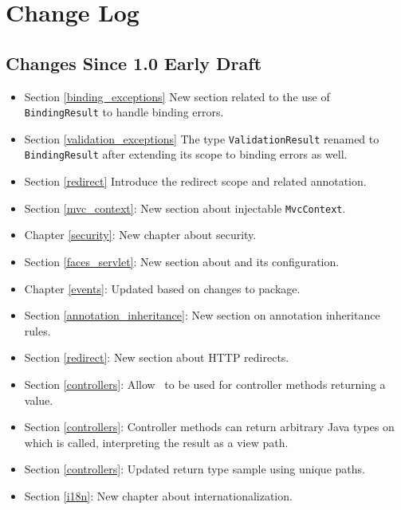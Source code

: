 \chapter{Change Log}

\section{Changes Since 1.0 Early Draft}

\begin{itemize}
\item Section \ref{binding_exceptions} New section related to the use of {\tt BindingResult}
to handle binding errors.
\item Section \ref{validation_exceptions} The type {\tt ValidationResult} renamed to 
{\tt BindingResult} after extending its scope to binding errors as well. 
\item Section \ref{redirect} Introduce the redirect scope and related annotation.
\item Section \ref{mvc_context}: New section about injectable {\tt MvcContext}.
\item Chapter \ref{security}: New chapter about security.
\item Section \ref{faces_servlet}: New section about  and its configuration.
\item Chapter \ref{events}: Updated based on changes to  package.
\item Section \ref{annotation_inheritance}: New section on annotation inheritance rules.
\item Section \ref{redirect}: New section about HTTP redirects.
\item Section \ref{controllers}: Allow \View\ to be used for controller methods returning a 
 value. 
\item Section \ref{controllers}: Controller methods can return arbitrary Java types on which 
 is called, interpreting the result as a view path.
\item Section \ref{controllers}: Updated return type sample using unique paths.
\item Section \ref{i18n}: New chapter about internationalization.
\end{itemize}
